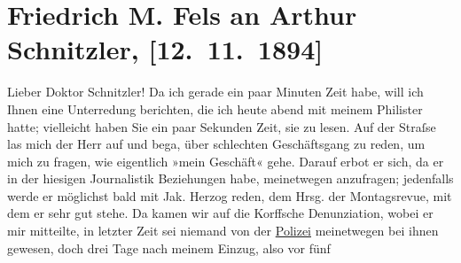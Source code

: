

               \section[Friedrich M. Fels an Arthur Schnitzler, {[}12. 11. 1894{]}]{ Friedrich M. Fels an Arthur Schnitzler, {[}12. 11. 1894{]}}\nopagebreak{}\rehead{ }\begin{ledgroupsized}[t]{13cm}\normalsize\beginnumbering{} \toendnotes[C]{\smallbreak\pagebreak[2]} 
\toendnotes[C]{\smallbreak}\pstart{}{\pb}Lieber Doktor Schnitzler!\pend\pstart
           Da ich gerade ein paar Minuten Zeit habe, will ich Ihnen eine Unterredung
                    berichten, die ich heute abend mit meinem Philister hatte; vielleicht haben Sie ein paar
                    Sekunden Zeit, sie zu lesen.\pend
           \pstart
           Auf der Straſse las mich der Herr auf und bega{\geminationn},
                    über schlechten Geschäftsgang zu reden, um mich zu fragen, wie eigentlich »mein
                    Geschäft« gehe. Darauf erbot er sich, da er in der hiesigen Journalistik
                    Beziehungen habe, meinetwegen anzufragen; jedenfalls werde er möglichst bald mit
                        Jak. Herzog reden, dem Hrsg. der Montagsrevue, mit dem er sehr gut stehe.\pend
           \pstart
           Da{\geminationn} kamen wir auf die Korffsche Denunziation, wobei er mir mitteilte, in
                    letzter Zeit sei niemand von der \uline{Polizei}
                    meinetwegen bei ihnen gewesen, doch drei Tage nach meinem Einzug, also vor fünf

\end{ledgroupsized}

